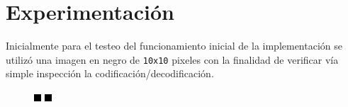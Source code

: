 \documentclass[conference]{IEEEtran}
\begin{document}
		
\section*{Experimentación}
    Inicialmente para el testeo del funcionamiento inicial de la implementación se utilizó una imagen en negro de \texttt{10x10} pixeles con la finalidad de verificar vía simple inspección la codificación/decodificación. \\
    
\begin{figure}[H]
\begin{multicols}{3}
    \centering
    \includegraphics[width=0.95\linewidth]{image/black2.png} \par
    \includegraphics[width=0.95\linewidth]{image/black4.png} \par

\end{multicols}
\end{figure}
\end{document}
